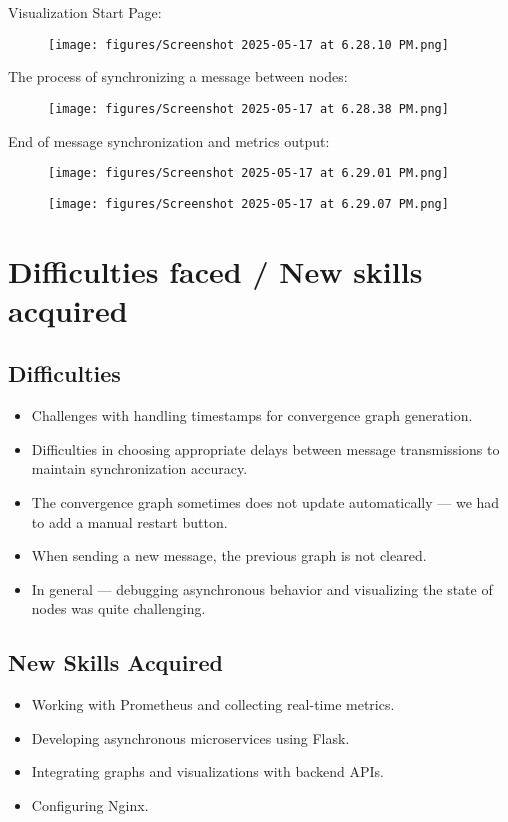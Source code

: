 \documentclass[a4paper,12pt]{article}
\begin{document}
Visualization Start Page:
\begin{figure}[H]
    \centering
    \texttt{[image: figures/Screenshot 2025-05-17 at 6.28.10 PM.png]}
    \label{fig:screenshot1}
\end{figure}
The process of synchronizing a message between nodes:
\begin{figure}[H]
    \centering
    \texttt{[image: figures/Screenshot 2025-05-17 at 6.28.38 PM.png]}
    \label{fig:screenshot2}
\end{figure}
End of message synchronization and metrics output:
\begin{figure}[H]
    \centering
    \texttt{[image: figures/Screenshot 2025-05-17 at 6.29.01 PM.png]}
    \label{fig:screenshot3}
\end{figure}
\begin{figure}[H]
    \centering
    \texttt{[image: figures/Screenshot 2025-05-17 at 6.29.07 PM.png]}
    \label{fig:screenshot4}
\end{figure}


\section{Difficulties faced / New skills acquired}

\subsection*{Difficulties}
\begin{itemize}
    \item Challenges with handling timestamps for convergence graph generation.
    \item Difficulties in choosing appropriate delays between message transmissions to maintain synchronization accuracy.
    \item The convergence graph sometimes does not update automatically — we had to add a manual restart button.
    \item When sending a new message, the previous graph is not cleared.
    \item In general — debugging asynchronous behavior and visualizing the state of nodes was quite challenging.
\end{itemize}

\subsection*{New Skills Acquired}
\begin{itemize}
    \item Working with Prometheus and collecting real-time metrics.
    \item Developing asynchronous microservices using Flask.
    \item Integrating graphs and visualizations with backend APIs.
    \item Configuring Nginx.
\end{itemize}
\end{document}
